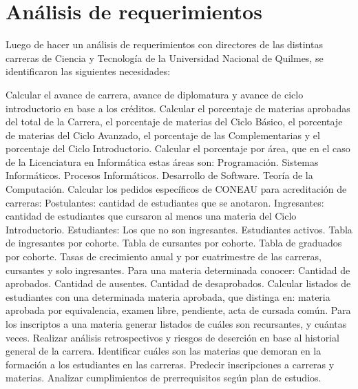 \section[Análisis de requerimientos]{Análisis de requerimientos}

Luego de hacer un análisis de requerimientos con directores de las distintas carreras de Ciencia y Tecnología de la Universidad Nacional de Quilmes, se identificaron las siguientes necesidades:

\begin{outline}
    \1 Calcular el avance de carrera, avance de diplomatura y avance de ciclo introductorio en base a los créditos.
    \1 Calcular el porcentaje de materias aprobadas del total de la Carrera, el porcentaje de materias del Ciclo Básico, el porcentaje de materias del Ciclo Avanzado, el porcentaje de las Complementarias y el porcentaje del Ciclo Introductorio.
    \1 Calcular el porcentaje por área, que en el caso de la Licenciatura en Informática estas áreas son: 
        \2 Programación.
        \2 Sistemas Informáticos.
        \2 Procesos Informáticos.
        \2 Desarrollo de Software.
        \2 Teoría de la Computación.
    \1 Calcular los pedidos específicos de CONEAU para acreditación de carreras:
        \2 Postulantes: cantidad de estudiantes que se anotaron.
        \2 Ingresantes: cantidad de estudiantes que cursaron al menos una materia del Ciclo Introductorio.
        \2 Estudiantes: Los que no son ingresantes. Estudiantes activos.
        \2 Tabla de ingresantes por cohorte.
        \2 Tabla de cursantes por cohorte.
        \2 Tabla de graduados por cohorte.
        \2 Tasas de crecimiento anual y por cuatrimestre de las carreras, cursantes y solo ingresantes.
    \1 Para una materia determinada conocer:
        \2 Cantidad de aprobados.
        \2 Cantidad de ausentes.
        \2 Cantidad de desaprobados.
    \1 Calcular listados de estudiantes con una determinada materia aprobada, que distinga en: materia aprobada por equivalencia, examen libre, pendiente, acta de cursada común.
    \1 Para los inscriptos a una materia generar listados de cuáles son recursantes, y cuántas veces.
    \1 Realizar análisis retrospectivos y riesgos de deserción en base al historial general de la carrera.
    \1 Identificar cuáles son las materias que demoran en la formación a los estudiantes en las carreras. 
    \1 Predecir inscripciones a carreras y materias.
    \1 Analizar cumplimientos de prerrequisitos según plan de estudios.
        
\end{outline}


